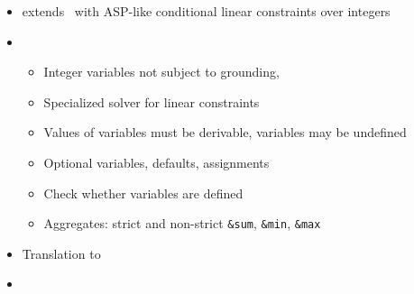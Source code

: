 \begin{frame}{\fclingo}
  \begin{itemize}
  \item {} extends \clingo\ with ASP-like conditional linear constraints over integers
  \item {}
    \begin{itemize}
    \item Integer variables not subject to grounding, 
    \item Specialized solver for linear constraints
    \item Values of variables must be derivable, variables may be undefined
    \item Optional variables, defaults, assignments
    \item Check whether variables are defined
    \item Aggregates: strict and non-strict \lstinline{&sum}, \lstinline{&min}, \lstinline{&max}
    \end{itemize}
  \item {} Translation to \clingcon
  \item {} \cite{cafascwa20a,cafascwa20b}
  \end{itemize}
\end{frame}
%
